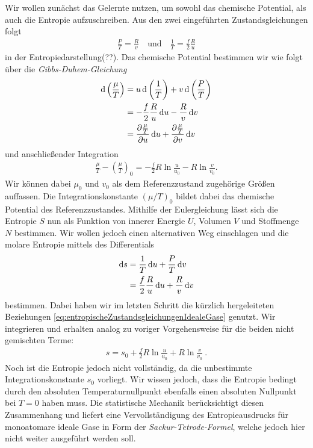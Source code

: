 Wir wollen zunächst das Gelernte nutzen, um sowohl das chemische Potential, als auch die Entropie aufzuschreiben. Aus den zwei eingeführten Zustandsgleichungen folgt
\begin{align}
    \label{eq:entropischeZustandsgleichungenIdealeGase}
    \boxed{\frac{P}{T}=\frac{R}{v} \quad\text{und}\quad \frac{1}{T}=\frac{f}{2}\frac{R}{u}}
\end{align}
in der Entropiedarstellung(??).
Das chemische Potential bestimmen wir wie folgt über die \emph{Gibbs-Duhem-Gleichung}
\begin{align*}
    \mathop{}\!\mathrm{d} \left(\frac{\mu}{T}\right) & =u\mathop{}\!\mathrm{d}\left(\frac{1}{T}\right)+v\mathop{}\!\mathrm{d} \left(\frac{P}{T}\right)                                    \\
                                     & =-\frac{f}{2}\frac{R}{u}\mathop{}\!\mathrm{d} u-\frac{R}{v}\mathop{}\!\mathrm{d} v                                                 \\
                                     & =\frac{\partial \frac{\mu}{T}}{\partial u}\mathop{}\!\mathrm{d} u+\frac{\partial \frac{\mu}{T}}{\partial v}\mathop{}\!\mathrm{d} v
\end{align*}
und anschließender Integration
\begin{align*}
    \frac{\mu}{T}-\left(\frac{\mu}{T}\right)_0=-\frac{f}{2}R\ln\frac{u}{u_0}-R\ln\frac{v}{v_0}.
\end{align*}
Wir können dabei $\mu_0$ und $v_0$ als dem Referenzzustand zugehörige Größen auffassen.
Die Integrationskonstante $(\mu/T)_0$ bildet dabei das chemische Potential des Referenzzustandes.
Mithilfe der Eulergleichung lässt sich die Entropie $S$ nun als Funktion von innerer Energie $U$, Volumen $V$ und Stoffmenge $N$ bestimmen. Wir wollen jedoch einen alternativen Weg einschlagen und die molare Entropie mittels des Differentials
\begin{align*}
    \mathop{}\!\mathrm{d} s & =\frac{1}{T}\mathop{}\!\mathrm{d} u+\frac{P}{T}\mathop{}\!\mathrm{d} v            \\
            & =\frac{f}{2}\frac{R}{u}\mathop{}\!\mathrm{d} u+\frac{R}{v}\mathop{}\!\mathrm{d} v
\end{align*}
bestimmen.
Dabei haben wir im letzten Schritt die kürzlich hergeleiteten Beziehungen \eqref{eq:entropischeZustandsgleichungenIdealeGase} genutzt.
Wir integrieren und erhalten analog zu voriger Vorgehensweise für die beiden nicht gemischten Terme:
\begin{align}
    \label{eq:EntropieEinkomponentigesIdealesGas}
    \boxed{s=s_0+\frac{f}{2}R\ln\frac{u}{u_0}+R\ln\frac{v}{v_0}}\:.
\end{align}
Noch ist die Entropie jedoch nicht vollständig, da die unbestimmte Integrationskonstante $s_0$ vorliegt. Wir wissen jedoch, dass die Entropie \textendash{} bedingt durch den absoluten Temperaturnullpunkt \textendash{} ebenfalls einen absoluten Nullpunkt bei $T=0$ haben muss.
Die statistische Mechanik berücksichtigt diesen Zusammenhang und liefert eine Vervollständigung des Entropieausdrucks für monoatomare ideale Gase in Form der \emph{Sackur-Tetrode-Formel}, welche jedoch hier nicht weiter ausgeführt werden soll.

